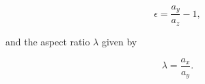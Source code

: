 \begin{equation}\label{eq:epsilon}
\epsilon = \frac{a_y}{a_z} - 1,
\end{equation}

and the aspect ratio $\lambda$ given by

\begin{equation}\label{eq:lambda}
\lambda = \frac{a_x}{a_y}.
\end{equation}




